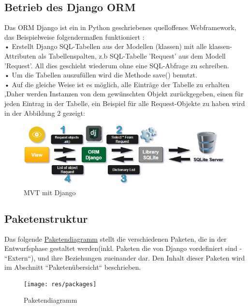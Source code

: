 \documentclass[parskip=full,11pt]{scrartcl}
\begin{document}
 \subsection{Betrieb des Django ORM} 
 
Das \gls{ORM} Django ist ein in Python geschriebenes quelloffenes Webframework, das Beispielweise folgendermaßen funktioniert :\\
 • Erstellt Django SQL-Tabellen aus der Modellen (klassen) mit alle klassen-Attributen als Tabellenspalten, z.b SQL-Tabelle 'Request' aus dem Modell 'Request'. All dies geschieht wiederum ohne eine SQL-Abfrage zu schreiben.\\
 • Um die Tabellen auszufüllen wird die Methode save() benutzt.\\
 • Auf die gleiche Weise ist es möglich, alle Einträge der Tabelle zu erhalten ,Daher werden Instanzen von dem gewünschten Objekt zurückgegeben, einen für jeden Eintrag in der Tabelle, ein Beispiel für alle Request-Objekte zu haben wird in der Abbildung 2 gezeigt:\\

  	\vspace{2cm}



\begin{figure}[ht!]
  	\includegraphics[width=1.05\textwidth]{res/MVTpart2.png}
  	 	\centering
  	    \caption{MVT mit Django}
 \end{figure}

 	

\newpage
 \subsection{Paketenstruktur}
 Das folgende \hyperref[packages]{Paketendiagramm} stellt die verschiedenen Paketen, die in der Entwurfsphase gestaltet werden(inkl. Paketen die von Django vordefiniert sind - ``Extern``), und ihre Beziehungen zueinander dar. Den Inhalt dieser Paketen wird im Abschnitt ``Paketenübersicht`` beschrieben.\\
 
 \begin{figure}[h]
 	\texttt{[image: res/packages]}
 	\centering
 	\caption{Paketendiagramm}
 	\label{packages}
 \end{figure}
 
\end{document}
